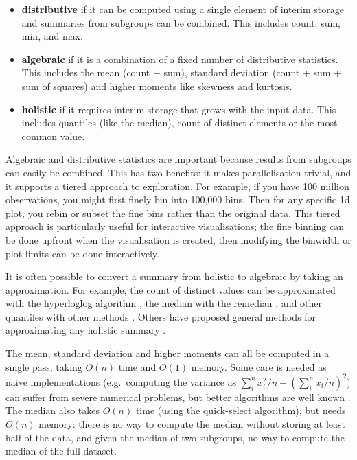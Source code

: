 \documentclass[journal]{vgtc}                %
\begin{document}
\begin{itemize}
  \item {\bf distributive} if it can be computed using a single element of interim storage and summaries from subgroups can be combined. This includes count, sum, min, and max.
  
  \item {\bf algebraic} if it is a combination of a fixed number of distributive statistics. This includes the mean (count + sum), standard deviation (count + sum + sum of squares) and higher moments like skewness and kurtosis.
  
  \item {\bf holistic} if it requires interim storage that grows with the input data. This includes quantiles (like the median), count of distinct elements or the most common value. 

\end{itemize}

Algebraic and distributive statistics are important because results from subgroups can easily be combined. This has two benefits: it makes parallelisation trivial, and it supports a tiered approach to exploration. For example, if you have 100 million observations, you might first finely bin into 100,000 bins. Then for any specific 1d plot, you rebin or subset the fine bins rather than the original data. This tiered approach is particularly useful for interactive visualisations; the fine binning can be done upfront when the visualisation is created, then modifying the binwidth or plot limits can be done interactively.

It is often possible to convert a summary from holistic to algebraic by taking an approximation. For example, the count of distinct values can be approximated with the hyperloglog algorithm \citep{flajolet:2007}, the median with the remedian \citep{rousseeuw:1990}, and other quantiles with other methods \citep{finkelstein:1994,hurley:1995,liechty:2003}. Others have proposed general methods for approximating any holistic summary \citep{christmann:2007}.

The mean, standard deviation and higher moments can all be computed in a single pass, taking $O(n)$ time and $O(1)$ memory. Some care is needed as naive implementations (e.g.\ computing the variance as $\sum_i^n x_i^2 / n - \left( \sum_i^n x_i / n \right)^2$) can suffer from severe numerical problems, but better algorithms are well known \citep{welford:1962}. The median also takes $O(n)$ time (using the quick-select algorithm), but needs $O(n)$ memory: there is no way to compute the median without storing at least half of the data, and given the median of two subgroups, no way to compute the median of the full dataset.
\end{document}
